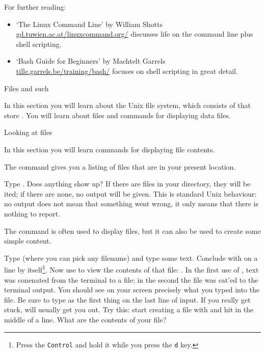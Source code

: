 For further reading:
\begin{itemize}
\item `The Linux Command Line' by William Shotts
  \url{gd.tuwien.ac.at/linuxcommand.org/} discusses life on the
  command line plus shell scripting.
\item `Bash Guide for Beginners' by Machtelt Garrels
  \url{tille.garrels.be/training/bash/} focuses on shell scripting in
  great detail.
\end{itemize}


 {Files and such}

\begin{purpose}
In this section you will learn about the Unix file system, which
consists of  that store . You
will learn about  files and commands for
displaying data files.
\end{purpose}

 {Looking at files}

\begin{purpose}
In this section you will learn commands for displaying file contents.
\end{purpose}

The  command gives you a listing of files that are in your
present location. 

\practical
{Type . Does anything show up?}
{If there are files in your directory, they will be ited; if
  there are none, no output will be given. This is standard Unix
  behaviour: no output does not mean that something went wrong, it
  only means that there is nothing to report.}{}

The  command is often used to display files, but it can also be
used to create some simple content. 

\practical
{Type  (where you can pick any
  filename) and type some text. Conclude with 
  on a line by itself\footnote 
  {Press the \texttt{Control} and hold it while you press the \texttt{d} key.}.
  Now use  to view the contents of that file: .}
{In the first use of , text was conenated from the
  terminal to a file; in the second the file was cat'ed to the
  terminal output. You should see on your screen precisely what you
  typed into the file.}
{Be sure to type  as the first thing on the last line of input. If you
  really get stuck,  will usually get you out. Try this:
  start creating a file with  and hit  in
  the middle of a line. What are the contents of your file?}

